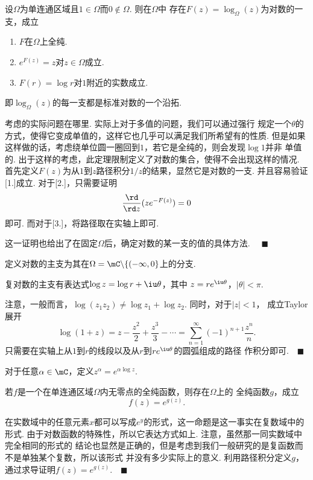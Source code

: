   \begin{thm}
    \label{thm: 复对数}
    设$\Omega$为单连通区域且$1\in\Omega$而$0\notin\Omega$. 则在$\Omega$中
    存在$F(z)=\log_{\Omega}(z)$为对数的一支，成立
    \begin{enumerate}
      \item $F$在$\Omega$上全纯.
      \item $e^{F(z)}=z$对$z\in\Omega$成立.
      \item $F(r)=\log r$对$1$附近的实数成立.
    \end{enumerate}
    即$\log_\Omega(z)$的每一支都是标准对数的一个沿拓.
  \end{thm}
  \remark
    考虑的实际问题在哪里. 实际上对于多值的问题，我们可以通过强行
    规定一个$\theta$的方式，使得它变成单值的，这样它也几乎可以满足我们所希望有的性质. 
    但是如果这样做的话，考虑绕单位圆一圈回到$1$，若它是全纯的，则会发现$\log 1$并非
    单值的. 出于这样的考虑，此定理限制定义了对数的集合，使得不会出现这样的情况.
  \proof
    首先定义$F(z)$为从$1$到$z$路径积分$1/z$的结果，显然它是对数的一支. 并且容易验证
    [1.]成立. 对于[2.]，只需要证明
    \[
      \frac{\rd}{\rd z}(ze^{-F(z)}) = 0
    \]
    即可. 而对于[3.]，将路径取在实轴上即可.\par
    这一证明也给出了在固定$\Omega$后，确定对数的某一支的值的具体方法. $\quad\blacksquare$

  \begin{defi}[主支]
    \label{defi: 复对数主支}
    定义对数的主支为其在$\Omega = \mC\backslash\{(-\infty, 0\}$上的分支.
  \end{defi}

  \begin{thm}[主支]
    复对数的主支有表达式$\log z = \log r + \iu\theta$，其中
    $z=re^{\iu\theta}$，$|\theta|<\pi$.
  \end{thm}
  \remark
    注意，一般而言，$\log(z_1z_2)\ne \log z_1 + \log z_2$. 同时，对于$|z|<1$，
    成立Taylor展开
    \[
      \log(1+z) = z-\frac{z^2}{2}+\frac{z^3}{3} - \cdots = 
      \sum_{n=1}^\infty (-1)^{n+1}\frac{z^n}{n}.
    \]
  \proof
    只需要在实轴上从$1$到$r$的线段以及从$r$到$re^{\iu\theta}$的圆弧组成的路径
    作积分即可.$\quad\blacksquare$

  \begin{defi}[指数]
    对于任意$\alpha\in\mC$，定义$z^\alpha = e^{\alpha\log z}$.
  \end{defi}

  \begin{thm}
    \label{thm: 全纯、对数存在性}
    若$f$是一个在单连通区域$\Omega$内无零点的全纯函数，则存在$\Omega$上的
    全纯函数$g$，成立
    \[
      f(z) = e^{g(z)}.
    \]
  \end{thm}
  \remark
    在实数域中的任意元素$x$都可以写成$e^y$的形式，这一命题是这一事实在复数域中的形式.
    由于对数函数的特殊性，所以它表达方式如上. 注意，虽然那一同实数域中完全相同的形式的
    结论也显然是正确的，但是考虑到我们一般研究的是复函数而不是单独某个复数，所以该形式
    并没有多少实际上的意义.
  \proof
    利用路径积分定义$g$，通过求导证明$f(z)=e^{g(z)}$.$\quad\blacksquare$


